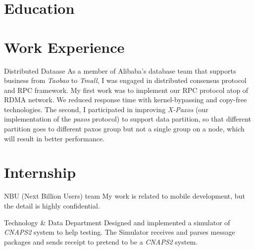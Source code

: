 \documentclass[11pt,a4paper]{moderncv}
\begin{document}
\makecvtitle

\section{Education}


\section{Work Experience}
{Distributed Dataase}
{}{}{
	As a member of Alibaba's database team that supports business from \textit{Taobao} to \textit{Tmall}, I was engaged in distributed consensus protocol and RPC framework. My first work was to implement our RPC protocol atop of RDMA network. We reduced response time with kernel-bypassing and copy-free technologies. The second, I participated in improving \textit{X-Paxos} (our implementation of the \textit{paxos} protocol) to support data partition, so that different partition goes to different paxos group but not a single group on a node, which will result in better performance.
}

\section{Internship}
{NBU (Next Billion Users) team}
{}{}{
	My work is related to mobile development, but the detail is highly confidential.
}

{Technology \& Data Department}
{}{}{
	Designed and implemented a simulator of \textsl{CNAPS2} system to help testing.
	The Simulator receives and parses message packages and sends receipt
	to pretend to be a \textsl{CNAPS2} system.
}
\end{document}
